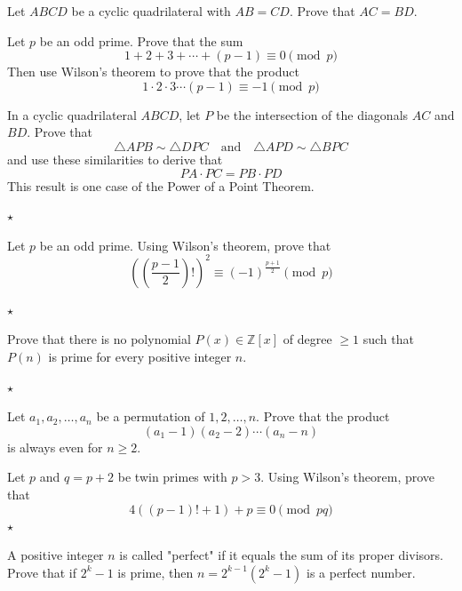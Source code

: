 \begin{problem}
Let $ABCD$ be a cyclic quadrilateral with $AB = CD$. Prove that  $AC = BD$. 
\end{problem}

\begin{problem}
Let $p$ be an odd prime. Prove that the sum
\[
1 + 2 + 3 + \cdots + (p-1) \equiv 0 \pmod{p}
\]
Then use Wilson's theorem to prove that the product
\[
1 \cdot 2 \cdot 3 \cdots (p-1) \equiv -1 \pmod{p}
\]
\end{problem}

\begin{problem}
In a cyclic quadrilateral $ABCD$, let $P$ be the intersection of the 
diagonals $AC$ and $BD$. Prove that
\[
\triangle APB \sim \triangle DPC \quad \text{and} \quad \triangle APD \sim \triangle BPC
\]
and use these similarities to derive that
\[
PA \cdot PC = PB \cdot PD
\]
This result is one case of the Power of a Point Theorem. 

 \hfill $\star$
\end{problem}

\begin{problem}
Let $p$ be an odd prime. Using Wilson's theorem, prove that
\[
\left(\left(\frac{p-1}{2}\right)!\right)^2 \equiv (-1)^{\frac{p+1}{2}} 
\pmod{p}
\]

\hfill $\star$
\end{problem}

\begin{problem}
Prove that there is no polynomial $P(x) \in \mathbb{Z}[x]$ of degree $\geq 1$ such that $P(n)$ is prime for every positive integer $n$. 

\hfill $\star$
\end{problem}

\begin{problem}
Let $a_1, a_2, \ldots, a_n$ be a permutation of $1, 2, \ldots, n$. Prove that the product
\[
(a_1 - 1)(a_2 - 2)\cdots(a_n - n)
\]
is always even for $n \geq 2$. 
\end{problem}

\begin{problem}
Let $p$ and $q = p+2$ be twin primes with $p > 3$. Using Wilson's theorem, prove that
\[
4((p-1)! + 1) + p \equiv 0 \pmod{pq}
\]
\hfill $\star$
\end{problem}

\begin{problem}
A positive integer $n$ is called "perfect" if it equals the sum of its proper divisors. Prove that if $2^k - 1$ is prime, then  $n = 2^{k-1}(2^k - 1)$ is a perfect number. 
\end{problem}

